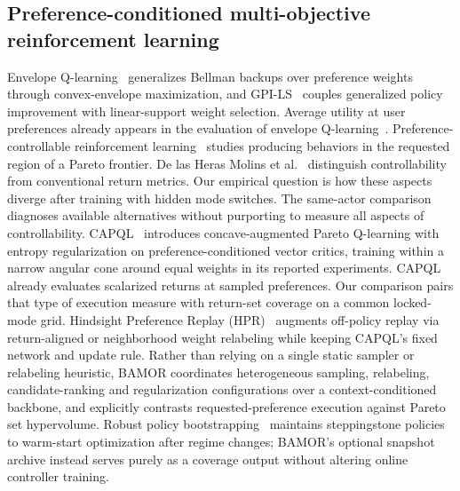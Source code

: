 \documentclass[10pt]{article}
\let\cite\citep
\begin{document}
\subsection{Preference-conditioned multi-objective reinforcement learning}
Envelope Q-learning~\cite{Yang2019Envelope} generalizes Bellman backups over
preference weights through convex-envelope maximization, and GPI-LS~\cite{Alegre2023GPILS}
couples generalized policy improvement with linear-support weight selection.
Average utility at user preferences already appears in the evaluation of
envelope Q-learning~\cite{Yang2019Envelope}. Preference-controllable
reinforcement learning~\cite{Yang2025PreferenceControllable} studies producing
behaviors in the requested region of a Pareto frontier. De las Heras Molins
et al.~\cite{Molins2026Controllability} distinguish controllability from
conventional return metrics. Our empirical question is how these
aspects diverge after training with hidden mode switches. The same-actor
comparison diagnoses available alternatives without purporting to measure
all aspects of controllability.
CAPQL~\cite{Lu2023CAPQL} introduces concave-augmented Pareto Q-learning with
entropy regularization on preference-conditioned vector critics, training
within a narrow angular cone around equal weights in its reported experiments.
CAPQL already evaluates scalarized returns at sampled preferences. Our
comparison pairs that type of execution measure with return-set coverage
on a common locked-mode grid. Hindsight Preference
Replay (HPR)~\cite{Shianifar2026HPR} augments off-policy replay via
return-aligned or neighborhood weight relabeling while keeping CAPQL's fixed
network and update rule. Rather than relying on a single static sampler or
relabeling heuristic, BAMOR coordinates heterogeneous sampling, relabeling,
candidate-ranking and regularization configurations over a context-conditioned
backbone, and explicitly contrasts requested-preference execution against
Pareto set hypervolume. Robust policy bootstrapping~\cite{Abdelfattah2023Bootstrapping}
maintains steppingstone policies to warm-start optimization after regime
changes; BAMOR's optional snapshot archive instead serves purely as a coverage
output without altering online controller training.
\end{document}
